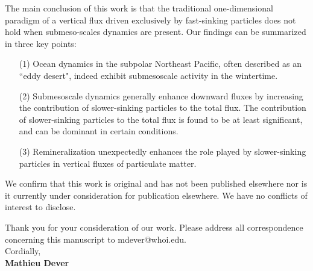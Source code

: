 \documentclass[11pt]{article}
\def\firstname{Mathieu }
\def\familyname{Dever}
\begin{document}
The main conclusion of this work is that the traditional one-dimensional paradigm of a vertical flux driven exclusively by fast-sinking particles does not hold when submeso-scales dynamics are present. Our findings can be summarized in three key points:

\begin{itemize}
	\item[(1)] Ocean dynamics in the subpolar Northeast Pacific, often described as an ``eddy desert", indeed exhibit submesoscale activity in the wintertime.
	\item[(2)] Submesoscale dynamics generally enhance downward fluxes by increasing the contribution of slower-sinking particles to the total flux. The contribution of slower-sinking particles to the total flux is found to be at least significant, and can be dominant in certain conditions.
	\item[(3)] Remineralization unexpectedly enhances the role played by slower-sinking particles in vertical fluxes of particulate matter.
\end{itemize}

We confirm that this work is original and has not been published elsewhere nor is it currently under consideration for publication elsewhere. We have no conflicts of interest to disclose.

Thank you for your consideration of our work. Please address all correspondence concerning this manuscript to mdever@whoi.edu.\\[.5cm]

\noindent Cordially,\\[.2cm]
%
{\bfseries \firstname \familyname}
\end{document}
